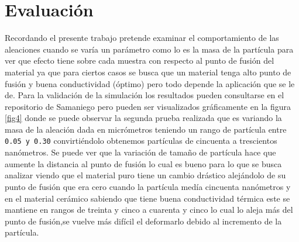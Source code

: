 \documentclass[3pt,twocolumn]{elsarticle}
\begin{document}
\section{Evaluación}\label{intr}
Recordando el presente trabajo pretende examinar el comportamiento de las aleaciones cuando se varía un parámetro como lo es la masa de la partícula para ver que efecto tiene sobre cada muestra con respecto al punto de fusión del material ya que para ciertos casos se busca que un material tenga alto punto de fusión y buena conductividad (óptimo) pero todo depende la aplicación que se le de. Para la validación de la simulación los resultados pueden consultarse en el repositorio de Samaniego \cite{Edson} pero pueden ser visualizados gráficamente en la figura \ref{fig4} donde se puede observar la segunda prueba realizada que es variando la masa de la aleación dada en micrómetros teniendo un rango de partícula entre \texttt{0.05 y 0.30} convirtiéndolo obtenemos partículas de cincuenta a trescientos nanómetros. Se puede ver que la variación de tamaño de partícula hace que aumente la distancia al punto de fusión lo cual es bueno para lo que se busca analizar viendo que el material puro tiene un cambio drástico alejándolo de su punto de fusión que era cero cuando la partícula medía cincuenta nanómetros y en el material cerámico sabiendo que tiene buena conductividad térmica este se mantiene en rangos de treinta y cinco a cuarenta y cinco lo cual lo aleja más del punto de fusión,se vuelve más difícil el deformarlo debido al incremento de la partícula.
\end{document}
